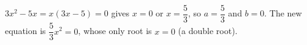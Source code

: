 $3x^2-5x=x(3x-5)=0$ gives $x=0$ or $x=\dfrac53$, so $a=\dfrac53$ and $b=0$. The new equation is $\dfrac53x^2=0$, whose only root is $\boxed{x=0}$ (a double root).
